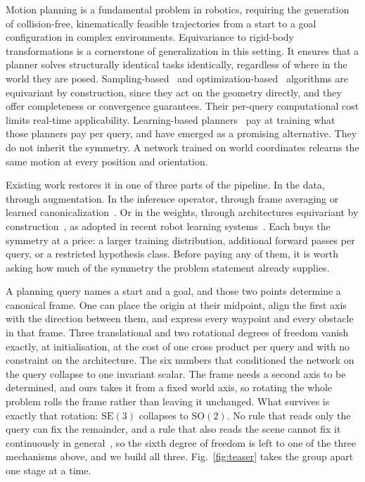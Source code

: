 \documentclass[conference]{IEEEtran}
\newcommand{\SE}{\mathrm{SE}(3)}
\begin{document}
Motion planning is a fundamental problem in robotics, requiring the generation of
collision-free, kinematically feasible trajectories from a start to a goal
configuration in complex environments. Equivariance to rigid-body transformations
is a cornerstone of generalization in this setting. It ensures that a planner
solves structurally identical tasks identically, regardless of where in the world
they are posed. Sampling-based~\cite{kuffner2000rrtconnect} and
optimization-based~\cite{schulman2014trajopt,zucker2013chomp} algorithms are
equivariant by construction, since they act on the geometry directly, and they
offer completeness or convergence guarantees. Their per-query computational cost
limits real-time applicability. Learning-based
planners~\cite{carvalho2023mpd,fishman2022mpinets,janner2022diffuser,qureshi2019mpnet}
pay at training what those planners pay per query, and have emerged as a
promising alternative. They do not inherit the symmetry. A network trained on
world coordinates relearns the same motion at every position and orientation.

Existing work restores it in one of three parts of the pipeline. In the data,
through augmentation. In the inference operator, through frame averaging or
learned canonicalization~\cite{puny2022fa, kaba2023canon}. Or in the weights,
through architectures equivariant by
construction~\cite{cohen2016gcnn,deng2021vn,fuchs2020se3t,thomas2018tfn}, as
adopted in recent robot learning systems~\cite{ryu2023edf,wang2024equidp}. Each
buys the symmetry at a price: a larger training distribution, additional forward
passes per query, or a restricted hypothesis class. Before paying any of them,
it is worth asking how much of the symmetry the problem statement already
supplies.

A planning query names a start and a goal, and those two points determine a canonical
frame. One can place the origin at their midpoint, align the first axis with the
direction between them, and express every waypoint and every obstacle in that
frame. Three translational and two rotational degrees of freedom vanish exactly,
at initialisation, at the cost of one cross product per query and with no constraint on the
architecture. The six numbers that conditioned the network on the query collapse
to one invariant scalar. The frame needs a second axis to be determined, and ours
takes it from a fixed world axis, so rotating the whole problem rolls the frame
rather than leaving it unchanged. What survives is exactly that rotation: $\SE$
collapses to $\mathrm{SO}(2)$. No rule that reads only the query can fix the remainder, and a rule that
also reads the scene cannot fix it continuously in general~\cite{dym2024frames},
so the sixth degree of freedom is left to one of the three mechanisms above, and
we build all three. Fig.~\ref{fig:teaser} takes the group apart
one stage at a time.
\end{document}

